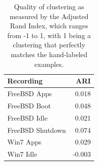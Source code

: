 \begin{table}
    \centering
    \small
    \begin{tabular}{|l|r|}
        \hline
        Recording & ARI \\
        \hline
        FreeBSD Apps & 0.018 \\
        FreeBSD Boot & 0.048 \\
        FreeBSD Idle & 0.021 \\
        FreeBSD Shutdown & 0.074 \\
        Win7 Apps & 0.029 \\
        Win7 Idle & -0.003 \\
        \hline
    \end{tabular}
\caption{Quality of clustering as measured by the Adjusted Rand Index,
which ranges from -1 to 1, with 1 being a clustering that perfectly
matches the hand-labeled examples.}
\label{tbl:clustqual}
\end{table}
